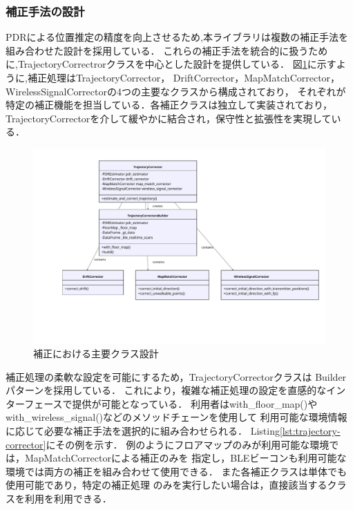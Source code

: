 
\subsubsection{補正手法の設計}

PDRによる位置推定の精度を向上させるため,本ライブラリは複数の補正手法を
組み合わせた設計を採用している．
これらの補正手法を統合的に扱うために,TrajectoryCorrectrorクラスを中心とした設計を提供している．
図\ref{fig:corrector-class}に示すように,補正処理はTrajectoryCorrector，
DriftCorrector，MapMatchCorrector，WirelessSignalCorrectorの4つの主要なクラスから構成されており，
それぞれが特定の補正機能を担当している．各補正クラスは独立して実装されており，
TrajectoryCorrectorを介して緩やかに結合され，保守性と拡張性を実現している．

\begin{figure}[H]
    \centering
    \includegraphics[width=\linewidth]{../image/trajectory_corrector.pdf}
    \caption{補正における主要クラス設計}
    \label{fig:corrector-class}
\end{figure}

補正処理の柔軟な設定を可能にするため，TrajectoryCorrectorクラスは
Builderパターンを採用している．
これにより，複雑な補正処理の設定を直感的なインターフェースで提供が可能となっている．
利用者はwith\_floor\_map()やwith\_wireless\_signal()などのメソッドチェーンを使用して
利用可能な環境情報に応じて必要な補正手法を選択的に組み合わせられる．
Listing\ref{lst:trajectory-corrector}にその例を示す．
例のようにフロアマップのみが利用可能な環境では，MapMatchCorrectorによる補正のみを
指定し，BLEビーコンも利用可能な環境では両方の補正を組み合わせて使用できる．
また各補正クラスは単体でも使用可能であり，特定の補正処理
のみを実行したい場合は，直接該当するクラスを利用を利用できる．


